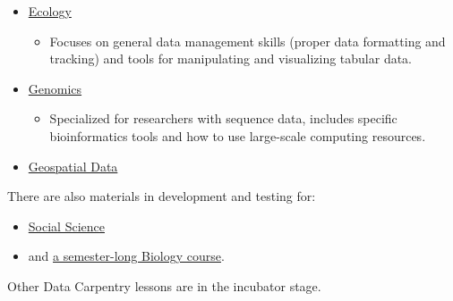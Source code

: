 \begin{itemize}
\item \href{\{\{ site.dc\_site \}\}/lessons/\#ecology-workshop}{Ecology}


\begin{itemize}
\item Focuses on general data management skills (proper 
data formatting and tracking) and tools for manipulating and 
visualizing tabular data.
\end{itemize}
\item \href{\{\{ site.dc\_site \}\}/lessons/\#genomics-workshop}{Genomics}


\begin{itemize}
\item Specialized for researchers with sequence data, includes specific 
bioinformatics tools and how to use large-scale computing resources.
\end{itemize}
\item \href{\{\{ site.dc\_site \}\}/lessons/\#geospatial-data-workshop}{Geospatial Data}
\end{itemize}

There are also materials in development and testing for:

\begin{itemize}
\item \href{\{\{ site.dc\_site \}\}/lessons/\#social-science-materials}{Social Science}
\item and \href{\{\{ site.dc\_site \}\}/semester-biology/}{a semester-long Biology course}.
\end{itemize}

Other Data Carpentry lessons are in the incubator stage.

